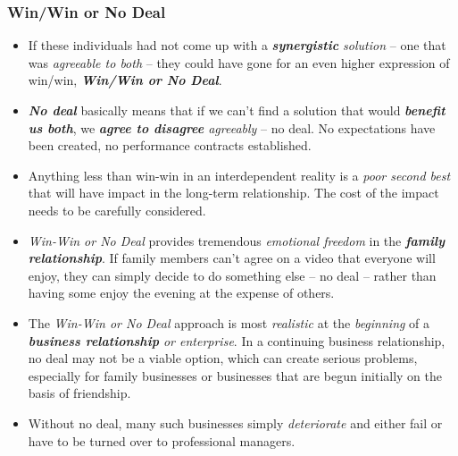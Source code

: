 \documentclass[11pt]{article}
\begin{document}
\subsubsection{Win/Win or No Deal}
\begin{itemize}
\item If these individuals had not come up with a \emph{\textbf{synergistic} solution} -- one that was \emph{agreeable to both} -- they could have gone for an even higher expression of win/win, \emph{\textbf{Win/Win or No Deal}}.

\item \emph{\textbf{No deal}} basically means that if we can't find a solution that would \emph{\textbf{benefit us both}}, we \emph{\textbf{agree to disagree} agreeably} -- no deal. No expectations have been created, no performance contracts established. 

\item Anything less than win-win in an interdependent reality is a \emph{poor second best} that will have impact in the long-term relationship. The cost of the impact needs to be carefully considered.



\item \emph{Win-Win or No Deal} provides tremendous \emph{emotional freedom} in the \emph{\textbf{family relationship}}. If family members can't agree on a video that everyone will enjoy, they can simply decide to do something else -- no deal -- rather than having some enjoy the evening at the expense of others.

\item The \emph{Win-Win or No Deal} approach is most \emph{realistic} at the \emph{beginning} of a \emph{\textbf{business relationship} or enterprise}. In a continuing business relationship, no deal may not be a viable option, which can create serious problems, especially for family businesses or businesses that are begun initially on the basis of friendship.

\item Without no deal, many such businesses simply \emph{deteriorate} and either fail or have to be turned over to professional managers. 
\end{itemize}
\end{document}
